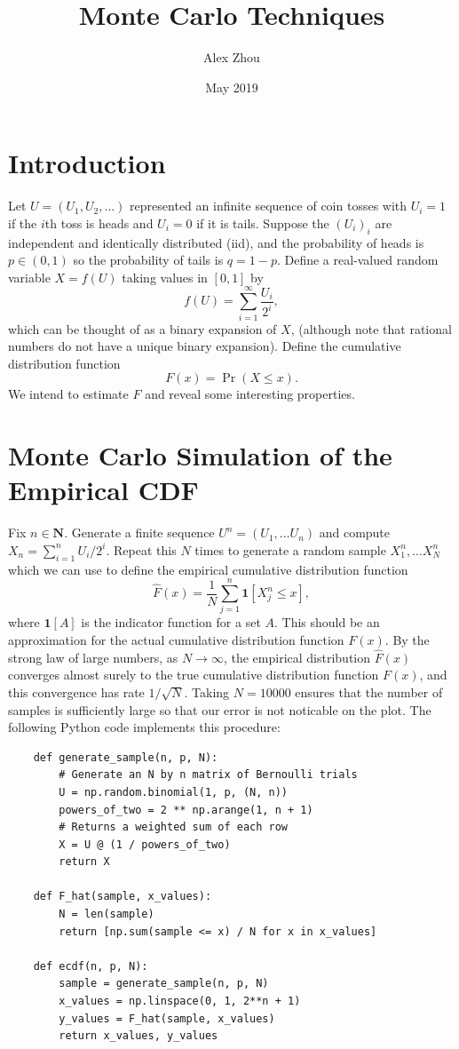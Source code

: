 \documentclass{article}
\title{Monte Carlo Techniques}
\author{Alex Zhou}
\date{May 2019}
\begin{document}
\maketitle

\section{Introduction}

Let \(U = (U_1, U_2, \dots)\) represented an infinite sequence of coin tosses with \(U_i = 1\) if the \(i\)th toss is heads and \(U_i = 0\) if it is tails. Suppose the \((U_i)_i\) are independent and identically distributed (iid), and the probability of heads is \(p \in (0,1)\) so the probability of tails is \(q = 1-p\). Define a real-valued random variable \(X = f(U)\) taking values in \([0,1]\) by
\[ f(U) = \sum_{i=1}^\infty\frac{U_i}{2^i}, \]
which can be thought of as a binary expansion of \(X\), (although note that rational numbers do not have a unique binary expansion). Define the cumulative distribution function
\[ F(x) = \Pr(X \leq x). \]
We intend to estimate \(F\) and reveal some interesting properties.

\section{Monte Carlo Simulation of the Empirical CDF}

Fix \(n \in \mathbf{N}\). Generate a finite sequence \(U^n = (U_1, \dots U_n)\) and compute \(X_n = \sum_{i=1}^n U_i/2^i\). Repeat this \(N\) times to generate a random sample \(X^n_1, \dots X^n_N\) which we can use to define the empirical cumulative distribution function
\[ \hat{F}(x) = \frac{1}{N}\sum_{j=1}^n \mathbf{1}[X^n_j \leq x], \]
where \(\mathbf{1}[A]\) is the indicator function for a set \(A\). This should be an approximation for the actual cumulative distribution function \(F(x)\). By the strong law of large numbers, as \(N \to \infty\), the empirical distribution \(\hat{F}(x)\) converges almost surely to the true cumulative distribution function \(F(x)\), and this convergence has rate \(1/\sqrt{N}\). Taking \(N = 10000\) ensures that the number of samples is sufficiently large so that our error is not noticable on the plot. The following Python code implements this procedure:

\begin{verbatim}
    def generate_sample(n, p, N):
        # Generate an N by n matrix of Bernoulli trials
        U = np.random.binomial(1, p, (N, n))
        powers_of_two = 2 ** np.arange(1, n + 1)
        # Returns a weighted sum of each row
        X = U @ (1 / powers_of_two)
        return X
    
    def F_hat(sample, x_values):
        N = len(sample)
        return [np.sum(sample <= x) / N for x in x_values]
    
    def ecdf(n, p, N):
        sample = generate_sample(n, p, N)
        x_values = np.linspace(0, 1, 2**n + 1)
        y_values = F_hat(sample, x_values)
        return x_values, y_values
\end{verbatim}
\end{document}
